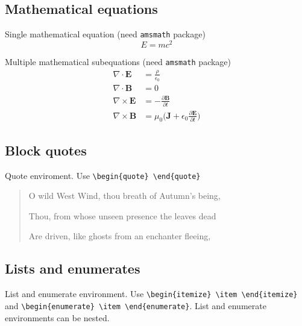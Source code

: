 \documentclass[draft]{emory}
\begin{document}
\subsection{Mathematical equations}
Single mathematical equation (need \Verb|amsmath| package)
\begin{equation}
  E = mc^2 \label{math:single}
\end{equation}

Multiple mathematical subequations (need \Verb|amsmath| package)
\begin{subequations}\label{math:sub}
\begin{align}
  \nabla\cdot\pmb{E}&=\frac{\rho}{\epsilon_0} \label{math:sub1}\\
  \nabla\cdot\pmb{B}&=0 \label{math:sub2} \\
  \nabla\times\pmb{E}&=-\frac{\partial\pmb{B}}{\partial t} \label{math:sub3}\\
  \nabla\times\pmb{B}&=\mu_0\Big(\pmb{J}+\epsilon_0\frac{\partial\pmb{E}}{\partial t}\Big) \label{math:sub4}
\end{align}
\end{subequations}

\subsection{Block quotes}
Quote enviroment. Use \Verb|\begin{quote} \end{quote}|

\begin{quote}\label{poet}
O wild West Wind, thou breath of Autumn's being,

Thou, from whose unseen presence the leaves dead

Are driven, like ghosts from an enchanter fleeing,
\end{quote}

\subsection{Lists and enumerates}
List and enumerate environment. Use \Verb|\begin{itemize} \item \end{itemize}|
and \Verb|\begin{enumerate} \item \end{enumerate}|. List and enumerate 
environments
can be nested.
\end{document}
